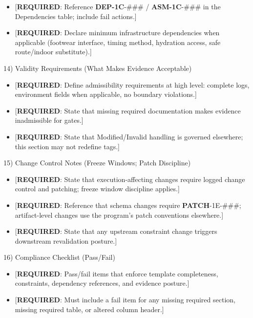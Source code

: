 \documentclass[10pt]{article}
\begin{document}
\begin{itemize}
\item {[\textbf{REQUIRED}: Reference \textbf{DEP-1C}-\#\#\# / \textbf{ASM-1C}-\#\#\# in the Dependencies table; include fail actions.]}
\item {[\textbf{REQUIRED}: Declare minimum infrastructure dependencies when applicable (footwear interface, timing method, hydration access, safe route/indoor substitute).]}
\end{itemize}

14) Validity Requirements (What Makes Evidence Acceptable)

\begin{itemize}
\item {[\textbf{REQUIRED}: Define admissibility requirements at high level: complete logs, environment fields when applicable, no boundary violations.]}
\item {[\textbf{REQUIRED}: State that missing required documentation makes evidence inadmissible for gates.]}
\item {[\textbf{REQUIRED}: State that Modified/Invalid handling is governed elsewhere; this section may not redefine tags.]}
\end{itemize}

15) Change Control Notes (Freeze Windows; Patch Discipline)

\begin{itemize}
\item {[\textbf{REQUIRED}: State that execution-affecting changes require logged change control and patching; freeze window discipline applies.]}
\item {[\textbf{REQUIRED}: Reference that schema changes require \textbf{PATCH}-1E-\#\#\#; artifact-level changes use the program’s patch conventions elsewhere.]}
\item {[\textbf{REQUIRED}: State that any upstream constraint change triggers downstream revalidation posture.]}
\end{itemize}

16) Compliance Checklist (Pass/Fail)

\begin{itemize}
\item {[\textbf{REQUIRED}: Pass/fail items that enforce template completeness, constraints, dependency references, and evidence posture.]}
\item {[\textbf{REQUIRED}: Must include a fail item for any missing required section, missing required table, or altered column header.]}
\end{itemize}
\end{document}
